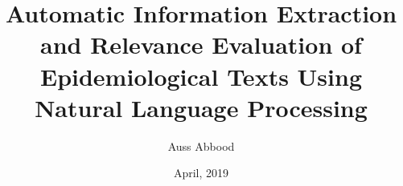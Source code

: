 
\title{Automatic Information Extraction and Relevance Evaluation of Epidemiological Texts Using Natural Language Processing}

\author{Auss Abbood}





\date{April, 2019}

